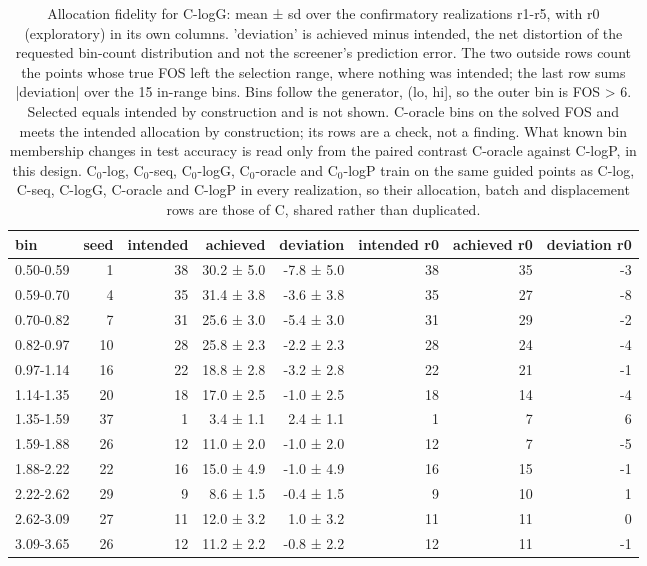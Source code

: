 \begin{table}[htbp]
\centering
\small
\setlength{\tabcolsep}{4pt}
\caption{Allocation fidelity for C-logG: mean ± sd over the confirmatory realizations r1-r5, with r0 (exploratory) in its own columns. 'deviation' is achieved minus intended, the net distortion of the requested bin-count distribution and not the screener's prediction error. The two outside rows count the points whose true FOS left the selection range, where nothing was intended; the last row sums |deviation| over the 15 in-range bins. Bins follow the generator, (lo, hi], so the outer bin is FOS > 6. Selected equals intended by construction and is not shown. C-oracle bins on the solved FOS and meets the intended allocation by construction; its rows are a check, not a finding. What known bin membership changes in test accuracy is read only from the paired contrast C-oracle against C-logP, in this design. C$_0$-log, C$_0$-seq, C$_0$-logG, C$_0$-oracle and C$_0$-logP train on the same guided points as C-log, C-seq, C-logG, C-oracle and C-logP in every realization, so their allocation, batch and displacement rows are those of C, shared rather than duplicated.}
\label{tab:structural:allocation:c-logg}
\begin{tabular}{lrrrrrrr}
\toprule
bin & seed & intended & achieved & deviation & intended r0 & achieved r0 & deviation r0 \\
\midrule
0.50-0.59 & 1 & 38 & 30.2 ± 5.0 & -7.8 ± 5.0 & 38 & 35 & -3 \\
0.59-0.70 & 4 & 35 & 31.4 ± 3.8 & -3.6 ± 3.8 & 35 & 27 & -8 \\
0.70-0.82 & 7 & 31 & 25.6 ± 3.0 & -5.4 ± 3.0 & 31 & 29 & -2 \\
0.82-0.97 & 10 & 28 & 25.8 ± 2.3 & -2.2 ± 2.3 & 28 & 24 & -4 \\
0.97-1.14 & 16 & 22 & 18.8 ± 2.8 & -3.2 ± 2.8 & 22 & 21 & -1 \\
1.14-1.35 & 20 & 18 & 17.0 ± 2.5 & -1.0 ± 2.5 & 18 & 14 & -4 \\
1.35-1.59 & 37 & 1 & 3.4 ± 1.1 & 2.4 ± 1.1 & 1 & 7 & 6 \\
1.59-1.88 & 26 & 12 & 11.0 ± 2.0 & -1.0 ± 2.0 & 12 & 7 & -5 \\
1.88-2.22 & 22 & 16 & 15.0 ± 4.9 & -1.0 ± 4.9 & 16 & 15 & -1 \\
2.22-2.62 & 29 & 9 & 8.6 ± 1.5 & -0.4 ± 1.5 & 9 & 10 & 1 \\
2.62-3.09 & 27 & 11 & 12.0 ± 3.2 & 1.0 ± 3.2 & 11 & 11 & 0 \\
3.09-3.65 & 26 & 12 & 11.2 ± 2.2 & -0.8 ± 2.2 & 12 & 11 & -1 \\

\end{tabular}
\end{table}
